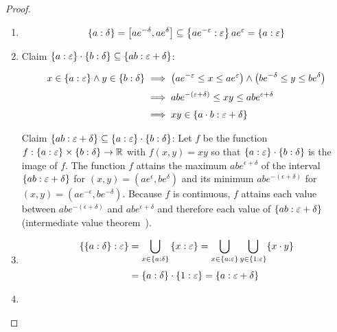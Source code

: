

\begin{proof} ~
  \begin{enumerate}
    \item
      
      \begin{align}
        \ean[\delta]{a} = \interval{ae^{-\delta}}{ae^\delta} \subseteq \ean[\epsilon]{ae^{-\epsilon}}{ae^\epsilon} = \ean[\epsilon]{a}
      \end{align}

    \item Claim $\ean[\epsilon]{a}\cdot \ean[\delta]{b} \subseteq \ean[\epsilon+\delta]{ab}$:

      \begin{align}
        x \in \ean[\epsilon]{a} \land y \in \ean[\delta]{b} & \implies \left(ae^{-\epsilon} \le x \le ae^{\epsilon}\right) \land \left(be^{-\delta} \le y \le be^\delta\right) \nl
        & \implies abe^{-(\epsilon+\delta)} \le xy \le abe^{\epsilon+\delta} \nl
        & \implies xy \in \ean[\epsilon+\delta]{a\cdot b}
      \end{align}

      Claim $\ean[\epsilon+\delta]{ab} \subseteq \ean[\epsilon]{a} \cdot \ean[\delta]{b}$: Let $f$ be the function $f: \ean[\epsilon]{a} \times \ean[\delta]{b} \to \R$ with $f(x,y) =xy$ so that $\ean[\epsilon]{a} \cdot \ean[\delta]{b}$ is the image of $f$. The function $f$ attains the maximum $abe^{\epsilon+\delta}$ of the interval $\ean[\epsilon+\delta]{ab}$ for $(x,y) = \left(ae^\epsilon,be^\delta\right)$ and its minimum $abe^{-(\epsilon+\delta)}$ for $(x,y)=\left(ae^{-\epsilon},be^{-\delta}\right)$. Because $f$ is continuous, $f$ attains each value between $abe^{-(\epsilon+\delta)}$ and $abe^{\epsilon+\delta}$ and therefore each value of $\ean[\epsilon+\delta]{ab}$ (intermediate value theorem~\cite{wiki:intermediatevaluetheorem}).

    \item

      \begin{align}
        \ean[\epsilon]{\ean[\delta]{a}} & = \bigcup_{x\in \ean[\delta]{a}} \ean[\epsilon]{x} = \bigcup_{x\in\ean[\epsilon]{a}} \bigcup_{y\in\ean[\epsilon]{1}} \{x\cdot y\} \nl
        &= \ean[\delta]{a} \cdot \ean[\epsilon]{1} = \ean[\epsilon+\delta]{a}
      \end{align}

    \item


\end{enumerate}
\end{proof}
